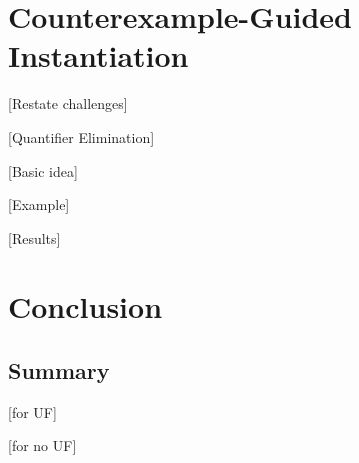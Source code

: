 \documentclass[oribibl]{llncs}
\begin{document}
\section{Counterexample-Guided Instantiation}
\label{sec:cegqi}

[Restate challenges]

[Quantifier Elimination]

[Basic idea]

[Example]

[Results]

\section{Conclusion}
\label{sec:conclusion}

\subsection{Summary}
[for UF]

[for no UF]
\end{document}
